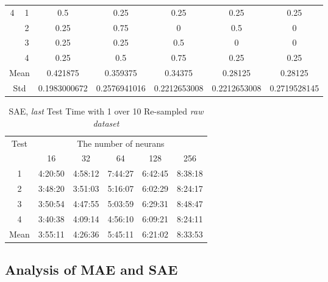 \documentclass[draft,dvipsnames]{drexel-thesis}
\begin{document}
\begin{thesis}
\begin{table}[!t]
\begin{tabular}{|c|c|c|c|c|c|c|}
\multirow{4}{*}{4}    & 1                   & 0.5          & 0.25         & 0.25         & 0.25         & 0.25         \\ \cline{2-7} 
                      & 2                   & 0.25         & 0.75         & 0            & 0.5          & 0            \\ \cline{2-7} 
                      & 3                   & 0.25         & 0.25         & 0.5          & 0            & 0            \\ \cline{2-7} 
                      & 4                   & 0.25         & 0.5          & 0.75         & 0.25         & 0.25         \\ \hline
\multicolumn{2}{|c|}{Mean}                  & 0.421875     & 0.359375     & 0.34375      & 0.28125      & 0.28125      \\ \hline
\multicolumn{2}{|c|}{Std}                   & 0.1983000672 & 0.2576941016 & 0.2212653008 & 0.2212653008 & 0.2719528145 \\ \hline
\end{tabular}
\end{table}

\begin{table}[!t]
\centering
\caption{SAE, {\em last} Test Time with 1 over 10 Re-sampled {\em raw dataset}}
\label{tbl:sae_last_1_10_time}
\begin{tabular}{|c|c|c|c|c|c|}
\hline
\multirow{2}{*}{Test} & \multicolumn{5}{c|}{The number of neurans}      \\ \cline{2-6} 
                      & 16      & 32      & 64      & 128     & 256     \\ \hline
1                     & 4:20:50 & 4:58:12 & 7:44:27 & 6:42:45 & 8:38:18 \\ \hline
2                     & 3:48:20 & 3:51:03 & 5:16:07 & 6:02:29 & 8:24:17 \\ \hline
3                     & 3:50:54 & 4:47:55 & 5:03:59 & 6:29:31 & 8:48:47 \\ \hline
4                     & 3:40:38 & 4:09:14 & 4:56:10 & 6:09:21 & 8:24:11 \\ \hline
Mean                  & 3:55:11 & 4:26:36 & 5:45:11 & 6:21:02 & 8:33:53 \\ \hline
\end{tabular}
\end{table}


\subsection{Analysis of MAE and SAE}






\end{thesis}
\end{document}
